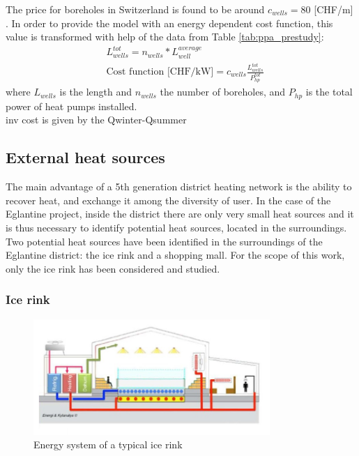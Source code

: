 \documentclass{article}
\begin{document}
The price for boreholes in Switzerland is found to be around $c_{wells} = 80$ [CHF/m] \cite{bawos.chMitErdsondenbohrungenKosten2018}. 
In order to provide the model with an energy dependent cost function, this value is transformed with help of the data from Table \ref{tab:ppa_prestudy}:
\begin{align}
&  L_{wells}^{tot} = n_{wells} * L_{well}^{average} \\
& 	\text{Cost function [CHF/kW]} = c_{wells} \frac{L_{wells}^{tot}}{P_{hp}^{tot}}
\end{align}
where $L_{wells}$ is the length and $n_{wells}$ the number of boreholes, and $P_{hp}$ is the total power of heat pumps installed.\\

inv cost is given by the Qwinter-Qsummer
\subsection{External heat sources}
The main advantage of a 5th generation district heating network is the ability to recover heat, and exchange it among the diversity of user. In the case of the Eglantine project, inside the district there are only very small heat sources and it is thus necessary to identify potential heat sources, located in the surroundings. 
Two potential heat sources have been identified in the surroundings of the Eglantine district: the ice rink and a shopping mall. For the scope of this work, only the ice rink has been considered and studied.

\subsubsection{Ice rink}

\begin{figure}[htp]
	\centering
	\includegraphics[width=0.8\textwidth]{IR_schema.JPG}
	\caption{Energy system of a typical ice rink \cite{gronqvistComparativeLifecycleCost}}
	\label{fig:IR_schema}
\end{figure}
\end{document}
